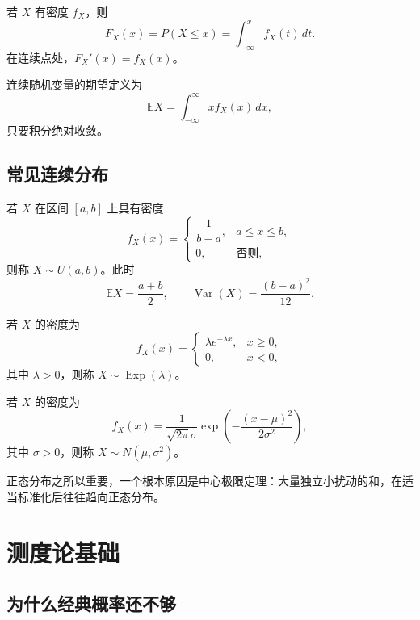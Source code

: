\begin{definition}[连续变量的分布函数]
若 $X$ 有密度 $f_X$，则
\[
    F_X(x)=P(X\le x)=\int_{-\infty}^x f_X(t)\,dt.
\]
在连续点处，$F_X'(x)=f_X(x)$。
\end{definition}

\begin{definition}[期望]
连续随机变量的期望定义为
\[
    \mathbb{E}X=\int_{-\infty}^{\infty}x f_X(x)\,dx,
\]
只要积分绝对收敛。
\end{definition}

\subsection{常见连续分布}

\begin{definition}[均匀分布]
若 $X$ 在区间 $[a,b]$ 上具有密度
\[
    f_X(x)=
    \begin{cases}
    \dfrac1{b-a},&a\le x\le b,\\
    0,&\text{否则},
    \end{cases}
\]
则称 $X\sim U(a,b)$。此时
\[
    \mathbb{E}X=\frac{a+b}{2},
    \qquad
    \operatorname{Var}(X)=\frac{(b-a)^2}{12}.
\]
\end{definition}

\begin{definition}[指数分布]
若 $X$ 的密度为
\[
    f_X(x)=
    \begin{cases}
    \lambda e^{-\lambda x},&x\ge0,\\
    0,&x<0,
    \end{cases}
\]
其中 $\lambda>0$，则称 $X\sim\operatorname{Exp}(\lambda)$。
\end{definition}

\begin{definition}[正态分布]
若 $X$ 的密度为
\[
    f_X(x)=\frac1{\sqrt{2\pi}\sigma}
    \exp\left(-\frac{(x-\mu)^2}{2\sigma^2}\right),
\]
其中 $\sigma>0$，则称 $X\sim N(\mu,\sigma^2)$。
\end{definition}

\begin{remark}
正态分布之所以重要，一个根本原因是中心极限定理：大量独立小扰动的和，在适当标准化后往往趋向正态分布。
\end{remark}

\section{测度论基础}

\subsection{为什么经典概率还不够}

